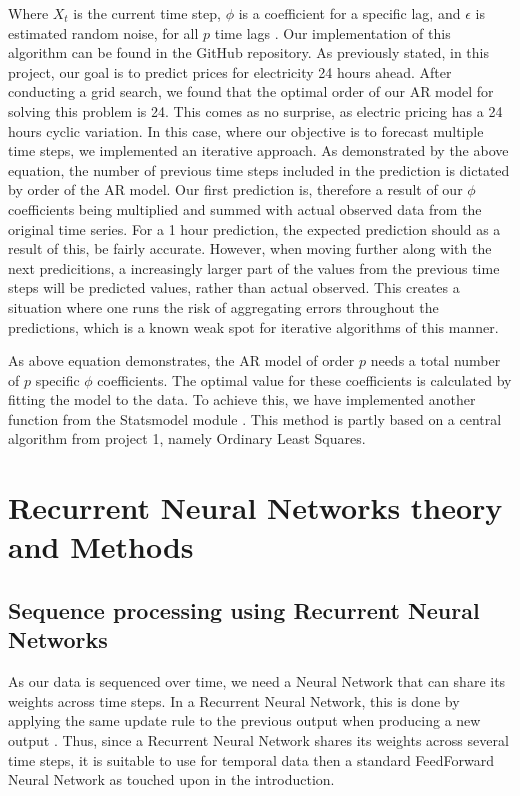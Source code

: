\documentclass
[twocolumn,
secnumarabic,
nobibnotes,
aps,
prl,
reprint,
groupedaddress,
amsmath,
amssymb,
]{revtex4-2}
\begin{document}
Where $X_t$ is the current time step, $\phi$ is a coefficient for a specific lag, and $\epsilon$ is estimated random noise, for all $p$ time lags \cite{Korstanje2021}. Our implementation of this algorithm can be found in the GitHub repository. As previously stated, in this project, our goal is to predict prices for electricity 24 hours ahead. After conducting a grid search, we found that the optimal order of our AR model for solving this problem is 24. This comes as no surprise, as electric pricing has a 24 hours cyclic variation. In this case, where our objective is to forecast multiple time steps, we implemented an iterative approach. As demonstrated by the above equation, the number of previous time steps included in the prediction is dictated by order of the AR model. Our first prediction is, therefore a result of our $\phi$ coefficients being multiplied and summed with actual observed data from the original time series. For a 1 hour prediction, the expected prediction should as a result of this, be fairly accurate. However, when moving further along with the next predicitions, a increasingly larger part of the values from the previous time steps will be predicted values, rather than actual observed. This creates a situation where one runs the risk of aggregating errors throughout the predictions, which is a known weak spot for iterative algorithms of this manner. 

As above equation demonstrates, the AR model of order $p$ needs a total number of $p$ specific $\phi$ coefficients. The optimal value for these coefficients is calculated by fitting the model to the data. To achieve this, we have implemented another function from the Statsmodel module \cite{seabold2010statsmodels}. This method is partly based on a central algorithm from project 1, namely Ordinary Least Squares\cite{Korstanje2021}.

\section{Recurrent Neural Networks theory and Methods}

\subsection{Sequence processing using Recurrent Neural Networks}
As our data is sequenced over time, we need a Neural Network that can share its weights across time steps. In a Recurrent Neural Network, this is done by applying the same update rule to the previous output when producing a new output \cite{Goodfellow2016}. Thus, since a Recurrent Neural Network shares its weights across several time steps, it is suitable to use for temporal data then a standard FeedForward Neural Network as touched upon in the introduction.
\end{document}
